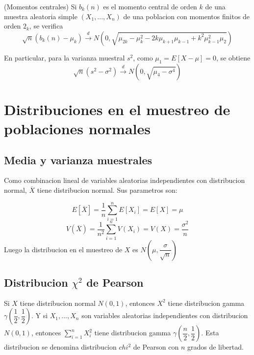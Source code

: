 \documentclass[10pt]{extarticle}
\newcommand{\<}{\langle}
\renewcommand{\>}{\rangle}
\theoremstyle{definition}
\begin{document}
\begin{theorem*}(Momentos centrales)
  Si $b_k(n)$ es el momento central de orden $k$ de una muestra aleatoria simple $(X_1, ..., X_n)$ de una poblacion con momentos finitos de orden $2_k$, se verifica
  \begin{equation*}
    \sqrt{n}(b_k(n)-\mu_k)\xrightarrow{d} N(0, \sqrt{\mu_{2k}-\mu_k^2-2k\mu_{k+1}\mu_{k-1}+k^2\mu^2_{k-1}\mu_2})
  \end{equation*}

  En particular, para la varianza muestral $s^2$, como $\mu_1=E[X-\mu]=0$, se obtiene
  \begin{equation*}
    \sqrt{n}(s^2-\sigma^2)\xrightarrow{d} N(0, \sqrt{\mu_4 - \sigma^4})
  \end{equation*}
\end{theorem*}

\newpage

\section{Distribuciones en el muestreo de poblaciones normales}

\subsection*{Media y varianza muestrales}

Como combinacion lineal de variables aleatorias independientes con distribucion normal, $\overline{X}$ tiene distribucion normal. Sus parametros son:

\begin{equation*}
  E[\overline{X}]=\dfrac{1}{n}\sum_{i=1}^nE[X_i]=E[X]=\mu
\end{equation*}
\begin{equation*}
  V(\overline{X})=\dfrac{1}{n^2}\sum_{i=1}^nV(X_i)=V(X)=\dfrac{\sigma^2}{n}
\end{equation*}
Luego la distribucion en el muestreo de $X$ es $N(\mu, \dfrac{\sigma}{\sqrt{n}})$

\subsection*{Distribucion $\chi^2$ de Pearson}
Si $X$ tiene distribucion normal $N(0,1)$, entonces $X^2$ tiene distribucion gamma $\gamma(\dfrac{1}{2}, \dfrac{1}{2})$. Y si $X_1, ..., X_n$ son variables aleatorias independientes con distribucion $N(0,1)$, entonces $\sum_{i=1}^nX_i^2$ tiene distribucion gamma $\gamma(\dfrac{n}{2}, \dfrac{1}{2})$. Esta distribucion se denomina distribucion $chi^2$ de Pearson con $n$ grados de libertad.
\end{document}

